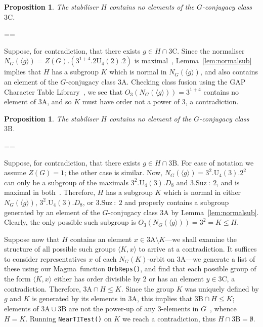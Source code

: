 \documentclass[11pt, a4paper]{amsart}
\makeatletter
\newcommand{\magma}{{\sc Magma}}
\def\cn{\mathord{{\!\:{:}\:\!}}}
\newtheorem{prop}[thm]{Proposition}
\renewcommand{\proofname}{Proof}
\renewenvironment{proof}[1][\proofname]{\par
  \pushQED{\qed}  \normalfont \partopsep=\z@skip \topsep=\z@skip
  \trivlist
  \item[\hskip\labelsep
        \scshape
    #1\@addpunct{.}]\ignorespaces
}{  \popQED\endtrivlist\@endpefalse
}
\makeatother
\begin{document}
\begin{prop}\label{prop:co1no3c}
    The stabiliser $H$ contains no elements of the $G$-conjugacy class $\mathrm{3C}$.
\end{prop}
\begin{proof}
    Suppose, for contradiction, that there exists $g\in H\cap\mathrm{3C}$. Since the normaliser $N_G(\langle g\rangle )=Z(G).(3^{1+4}.2\mathrm{U}_4(2).2)$ is maximal~\cite{atlas}, Lemma~\ref{lem:normalsub} implies that $H$ has a subgroup $K$ which is normal in $N_G(\langle g\rangle)$, and also contains an element of the $G$-conjugacy class $\mathrm{3A}$. Checking class fusion using the {\sf GAP} Character Table Library~\cite{CTblLib1.3.11}, we see that $O_3(N_G(\langle g\rangle))=3^{1+4}$ contains no element of $\mathrm{3A}$, and so $K$ must have order not a power of 3, a contradiction.
\end{proof}
\begin{prop}\label{prop:co1no3B}
    The stabiliser $H$ contains no element of the $G$-conjugacy class $\mathrm{3B}$. 
\end{prop}
\begin{proof}
    Suppose, for contradiction, that there exists $g\in H\cap\mathrm{3B}$. For ease of notation we assume $Z(G)=1$; the other case is similar. Now, $N_G(\langle g\rangle )=3^{2}.\mathrm{U}_4(3).2^2$ can only be a subgroup of the maximals $3^{2}.\mathrm{U}_4(3).D_8$ and $3.\mathrm{Suz}\cn2$, and is maximal in both~\cite{atlas}. Therefore, $H$ has a subgroup $K$ which is normal in either $N_G(\langle g\rangle)$, $3^{2}.\mathrm{U}_4(3).D_8$, or $3.\mathrm{Suz}\cn2$ and properly contains a subgroup generated by an element of the $G$-conjugacy class $\mathrm{3A}$ by Lemma~\ref{lem:normalsub}. Clearly, the only possible such subgroup is $O_3(N_G(\langle g\rangle)) =3^2=K\leq H$. 
    
    Suppose now that $H$ contains an element $x\in\mathrm{3A}\setminus K$---we shall examine the structure of all possible such groups $\langle K,x\rangle$ to arrive at a contradiction. It suffices to consider representatives $x$ of each $N_G(K)$-orbit on $\mathrm{3A}$---we generate a list of these using our \magma~function {\tt OrbReps()}, and find that each possible group of the form $\langle K,x\rangle$ either has order divisible by 2 or has an element $y\in \mathrm{3C}$, a contradiction. Therefore, $\mathrm{3A}\cap H\leq K$. Since the group $K$ was uniquely defined by $g$ and $K$ is generated by its elements in 3A, this implies that $\mathrm{3B}\cap H\leq K$; elements of $\mathrm{3A}\cup\mathrm{3B}$ are not the power-up of any 3-elements in $G$~\cite{atlas}, whence $H=K$. Running {\tt NearTITest()} on $K$ we reach a contradiction, thus $H\cap\mathrm{3B}=\emptyset$.
\end{proof}
\end{document}
